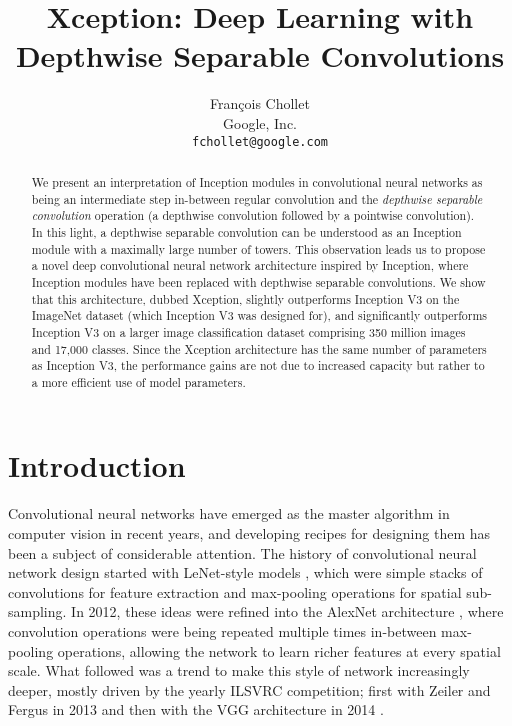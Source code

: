 \documentclass[10pt,twocolumn,letterpaper]{article}
\begin{document}
\title{Xception: Deep Learning with Depthwise Separable Convolutions}

\author{
  Fran\c{c}ois Chollet \\
  Google, Inc. \\
  {\tt\small fchollet@google.com} \\
}

\maketitle

\begin{abstract}

We present an interpretation of Inception modules in convolutional neural networks as being an intermediate step in-between regular convolution and the \textit{depthwise separable convolution} operation (a depthwise convolution followed by a pointwise convolution). In this light, a depthwise separable convolution can be understood as an Inception module with a maximally large number of towers. This observation leads us to propose a novel deep convolutional neural network architecture inspired by Inception, where Inception modules have been replaced with depthwise separable convolutions. We show that this architecture, dubbed Xception, slightly outperforms Inception V3 on the ImageNet dataset (which Inception V3 was designed for), and significantly outperforms Inception V3 on a larger image classification dataset comprising 350 million images and 17,000 classes. Since the Xception architecture has the same number of parameters as Inception V3, the performance gains are not due to increased capacity but rather to a more efficient use of model parameters.

\end{abstract}


\section{Introduction}

Convolutional neural networks have emerged as the master algorithm in computer vision in recent years, and developing recipes for designing them has been a subject of considerable attention. The history of convolutional neural network design started with LeNet-style models \cite{lecun1995learning}, which were simple stacks of convolutions for feature extraction and max-pooling operations for spatial sub-sampling.
In 2012, these ideas were refined into the AlexNet architecture \cite{krizhevsky2012imagenet},
where convolution operations were being repeated multiple times in-between max-pooling operations,
allowing the network to learn richer features at every spatial scale.
What followed was a trend to make this style of network increasingly deeper,
mostly driven by the yearly ILSVRC competition; first with Zeiler and Fergus in 2013 \cite{zeiler2014visualizing}
and then with the VGG architecture in 2014 \cite{simonyan2014very}.
\end{document}
